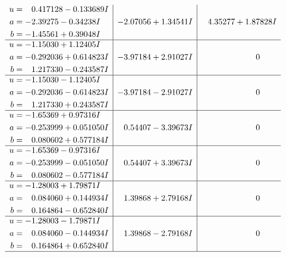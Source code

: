 \documentclass[1p]{elsarticle_modified}
\theoremstyle{definition}
\begin{document}
$$\begin{array}{c|c|c}
\begin{aligned}
u &= \phantom{-}0.417128 - 0.133689 I \\
a &= -2.39275 - 0.34238 I \\
b &= -1.45561 + 0.39048 I\end{aligned}
 & -2.07056 + 1.34541 I & \phantom{-}4.35277 + 1.87828 I \\ \hline\begin{aligned}
u &= -1.15030 + 1.12405 I \\
a &= -0.292036 + 0.614823 I \\
b &= \phantom{-}1.217330 - 0.243587 I\end{aligned}
 & -3.97184 + 2.91027 I & \phantom{-0.000000 } 0 \\ \hline\begin{aligned}
u &= -1.15030 - 1.12405 I \\
a &= -0.292036 - 0.614823 I \\
b &= \phantom{-}1.217330 + 0.243587 I\end{aligned}
 & -3.97184 - 2.91027 I & \phantom{-0.000000 } 0 \\ \hline\begin{aligned}
u &= -1.65369 + 0.97316 I \\
a &= -0.253999 + 0.051050 I \\
b &= \phantom{-}0.080602 + 0.577184 I\end{aligned}
 & \phantom{-}0.54407 - 3.39673 I & \phantom{-0.000000 } 0 \\ \hline\begin{aligned}
u &= -1.65369 - 0.97316 I \\
a &= -0.253999 - 0.051050 I \\
b &= \phantom{-}0.080602 - 0.577184 I\end{aligned}
 & \phantom{-}0.54407 + 3.39673 I & \phantom{-0.000000 } 0 \\ \hline\begin{aligned}
u &= -1.28003 + 1.79871 I \\
a &= \phantom{-}0.084060 + 0.144934 I \\
b &= \phantom{-}0.164864 - 0.652840 I\end{aligned}
 & \phantom{-}1.39868 + 2.79168 I & \phantom{-0.000000 } 0 \\ \hline\begin{aligned}
u &= -1.28003 - 1.79871 I \\
a &= \phantom{-}0.084060 - 0.144934 I \\
b &= \phantom{-}0.164864 + 0.652840 I\end{aligned}
 & \phantom{-}1.39868 - 2.79168 I & \phantom{-0.000000 } 0\\
 \hline 
 \end{array}$$\newpage\newpage\renewcommand{\arraystretch}{1}
\end{document}
